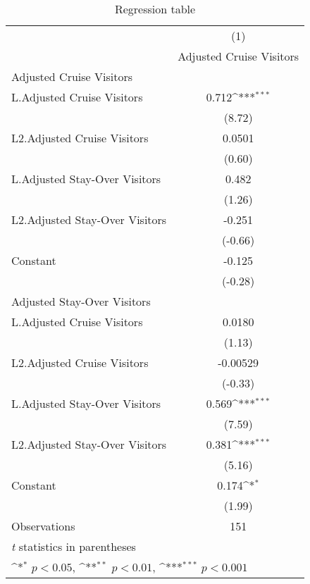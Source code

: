 \begin{table}[htbp]\centering
\def\sym#1{\ifmmode^{#1}\else\(^{#1}\)\fi}
\caption{Regression table\label{granger}}
\begin{tabular}{l*{1}{c}}
\hline\hline
                    &\multicolumn{1}{c}{(1)}\\
                    &\multicolumn{1}{c}{Adjusted Cruise Visitors}\\
\hline
Adjusted Cruise Visitors&                     \\
L.Adjusted Cruise Visitors&       0.712\sym{***}\\
                    &      (8.72)         \\
[1em]
L2.Adjusted Cruise Visitors&      0.0501         \\
                    &      (0.60)         \\
[1em]
L.Adjusted Stay-Over Visitors&       0.482         \\
                    &      (1.26)         \\
[1em]
L2.Adjusted Stay-Over Visitors&      -0.251         \\
                    &     (-0.66)         \\
[1em]
Constant            &      -0.125         \\
                    &     (-0.28)         \\
\hline
Adjusted Stay-Over Visitors&                     \\
L.Adjusted Cruise Visitors&      0.0180         \\
                    &      (1.13)         \\
[1em]
L2.Adjusted Cruise Visitors&    -0.00529         \\
                    &     (-0.33)         \\
[1em]
L.Adjusted Stay-Over Visitors&       0.569\sym{***}\\
                    &      (7.59)         \\
[1em]
L2.Adjusted Stay-Over Visitors&       0.381\sym{***}\\
                    &      (5.16)         \\
[1em]
Constant            &       0.174\sym{*}  \\
                    &      (1.99)         \\
\hline
Observations        &         151         \\
\hline\hline
\multicolumn{2}{l}{\footnotesize \textit{t} statistics in parentheses}\\
\multicolumn{2}{l}{\footnotesize \sym{*} \(p<0.05\), \sym{**} \(p<0.01\), \sym{***} \(p<0.001\)}\\
\end{tabular}
\end{table}
